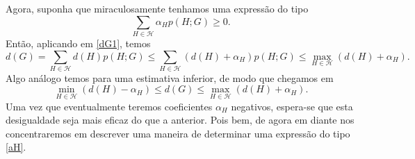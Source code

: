 \documentclass{amsart}
\theoremstyle{theorem}
\theoremstyle{definition}
\theoremstyle{remark}
\numberwithin{equation}{section}
\begin{document}
Agora, suponha que miraculosamente tenhamos uma express\~{a}o do tipo
\begin{equation}\label{aH}
  \sum_{H \in \mathcal{H}} \alpha_H p(H;G) \geq 0.
\end{equation}
Ent\~{a}o, aplicando em \ref{dG1}, temos
\begin{equation*}
  d(G) = \sum_{H\in\mathcal{H}} d(H)p(H;G) \leq \sum_{H\in\mathcal{H}} (d(H) + \alpha_H) p(H;G) \leq \max_{H\in\mathcal{H}}{(d(H)+\alpha_H)}.
\end{equation*}
Algo an\'{a}logo temos para uma estimativa inferior, de modo que chegamos em
\begin{equation}\label{limitantes}
  \min_{H\in\mathcal{H}}{(d(H)-\alpha_H)} \leq d(G) \leq \max_{H\in\mathcal{H}}{(d(H)+\alpha_H)}.
\end{equation}
Uma vez que eventualmente teremos coeficientes $\alpha_H$ negativos, espera-se que esta desigualdade seja mais eficaz do que a anterior. Pois bem, de agora em diante nos concentraremos em descrever uma maneira de determinar uma express\~{a}o do tipo \ref{aH}.
\end{document}
